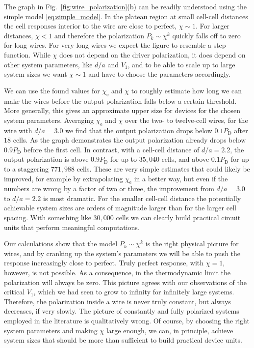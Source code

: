 The graph in Fig.~\ref{fig:wire_polarization}(b) can be readily understood using
the simple model \eqref{eq:simple_model}. In the plateau region at small
cell-cell distances the cell responses interior to the wire are close to
perfect, $\chi \sim 1$. For larger distances, $\chi < 1$ and therefore the
polarization $P_k \sim \chi^k$ quickly falls off to zero for long wires. For
very long wires we expect the figure to resemble a step function. While $\chi$
does not depend on the driver polarization, it does depend on other system
parameters, like $d/a$ and $V_1$, and to be able to scale up to large system
sizes we want $\chi \sim 1$ and have to choose the parameters accordingly.

We can use the found values for $\chi_\text{e}$ and $\chi$ to roughly estimate how long
we can make the wires before the output polarization falls below a certain
threshold. More generally, this gives an approximate upper size for 
devices for the chosen system parameters. Averaging $\chi_\text{e}$ and $\chi$ over the
two- to twelve-cell wires, for the wire with $d/a = 3.0$ we find that the output
polarization drops below $0.1 P_\text{D}$ after $18$ cells. As the graph demonstrates
the output polarization already drops below $0.9 P_\text{D}$ before the first cell. In
contrast, with a cell-cell distance of $d/a = 2.2$, the output polarization is
above $0.9 P_\text{D}$ for up to $35,040$ cells, and above $0.1 P_\text{D}$ for up to a
staggering $771,988$ cells. These are very simple estimates that could likely be
improved, for example by extrapolating $\chi_\text{e}$ in a better way, but even if the
numbers are wrong by a factor of two or three, the improvement from $d/a = 3.0$
to $d/a = 2.2$ is most dramatic. For the smaller cell-cell distance the
potentially achievable system sizes are orders of magnitude larger than for the
larger cell spacing. With something like $30,000$ cells we can clearly build
practical circuit units that perform meaningful computations.

Our calculations show that the model $P_k \sim \chi^k$ is the right physical
picture for  wires, and by cranking up the system's parameters we will
be able to push the response increasingly close to perfect. Truly perfect
response, with $\chi = 1$, however, is not possible. As a consequence, in the
thermodynamic limit the polarization will always be zero. This picture agrees
with our observations of the critical $V_1$, which we had seen to grow to
infinity for infinitely large systems. Therefore, the polarization inside a wire
is never truly constant, but always decreases, if very slowly. The picture of
constantly and fully polarized  systems employed in the literature is
qualitatively wrong. Of course, by choosing the right system parameters and
making $\chi$ large enough, we can, in principle, achieve system sizes that
should be more than sufficient to build practical device units. 

